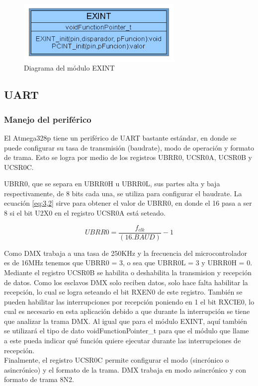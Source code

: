 \begin{figure}[!ht]
	\centering
	\includegraphics[width=8cm,scale=1]{resources/3_5-moduloEXINT.png}
	\caption{Diagrama del módulo EXINT}
	\label{fig:\thefigure}
\end{figure}


\subsection{UART}
\subsubsection{Manejo del periférico}
El Atmega328p tiene un periférico de UART bastante estándar, en donde se puede configurar su tasa de transmisión (baudrate), modo de operación y formato de trama. Esto se logra por medio de los registros UBRR0, UCSR0A, UCSR0B y UCSR0C.

UBRR0, que se separa en UBRR0H u UBRR0L, sus partes alta y baja respectivamente, de 8 bits cada una, se utiliza para configurar el baudrate. La ecuación \ref{eq:3,2} sirve para obtener el valor de UBRR0, en donde el 16 pasa a ser 8 si el bit U2X0 en el registro UCSR0A está seteado.

\begin{equation} \label{eq:\theequation}
	UBRR0 = \frac{f_{clk}}{(16.BAUD)} - 1
\end{equation}

Como DMX trabaja a una tasa de 250KHz y la frecuencia del microcontrolador es de 16MHz tenemos que UBRR0 = 3, o sea que UBRR0L = 3 y UBRR0H = 0. \\
Mediante el registro UCSR0B se habilita o deshabilita la transmision y recepción de datos. Como los esclavos DMX solo reciben datos, solo hace falta habilitar la recepción, lo cual se logra seteando el bit RXEN0 de este registro. También se pueden habilitar las interrupciones por recepción poniendo en 1 el bit RXCIE0, lo cual es necesario en esta aplicación debido a que durante la interrupción se tiene que analizar la trama DMX. Al igual que para el módulo EXINT, aquí también se utilizará el tipo de dato voidFunctionPointer\_t para que el módulo que llame a este pueda indicar qué función quiere ejecutar durante las interrupciones de recepción.\\
Finalmente, el registro UCSR0C permite configurar el modo (sincrónico o asincrónico) y el formato de la trama. DMX trabaja en modo asincrónico y con formato de trama 8N2.

